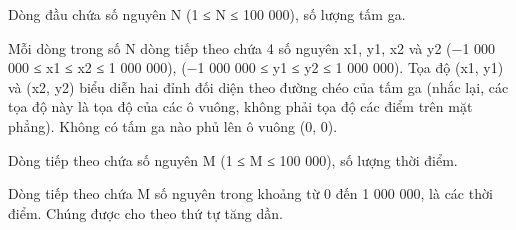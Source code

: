 Dòng đầu chứa số nguyên N (1 ≤ N ≤ 100 000), số lượng tấm ga.  

   Mỗi dòng trong số N dòng tiếp theo chứa 4 số nguyên x1, y1, x2 và y2 (−1 000 000 ≤ x1 ≤ x2 ≤ 1 000 000), (−1 000 000 ≤ y1 ≤ y2 ≤ 1 000 000). Tọa độ (x1, y1) và (x2, y2) biểu diễn hai đỉnh đối diện theo đường chéo của tấm ga (nhắc lại, các tọa độ này là tọa độ của các ô vuông, không phải tọa độ các điểm trên mặt phẳng). Không có tấm ga nào phủ lên ô vuông (0, 0).  

   Dòng tiếp theo chứa số nguyên M (1 ≤ M ≤ 100 000), số lượng thời điểm.  

   Dòng tiếp theo chứa M số nguyên trong khoảng từ 0 đến 1 000 000, là các thời điểm. Chúng được cho theo thứ tự tăng dần.  

\